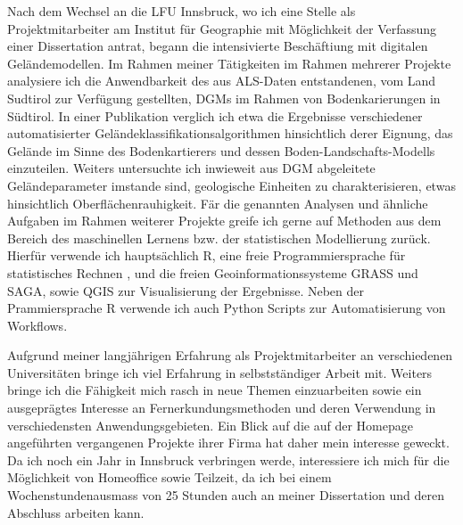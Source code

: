 \documentclass[11pt,a4paper,sans]{moderncv}        %
\begin{document}
Nach dem Wechsel an die LFU Innsbruck, wo ich eine Stelle als Projektmitarbeiter am Institut f\"{u}r Geographie mit M\"{o}glichkeit der Verfassung einer Dissertation antrat, begann die intensivierte Besch\"{a}ftiung mit digitalen Gel\"andemodellen. Im Rahmen meiner T\"{a}tigkeiten im Rahmen mehrerer Projekte analysiere ich die Anwendbarkeit des aus ALS-Daten entstandenen, vom Land Sudtirol zur Verf\"{u}gung gestellten, DGMs im Rahmen von Bodenkarierungen in S\"{u}dtirol. In einer Publikation verglich ich etwa die Ergebnisse verschiedener automatisierter Gel\"{a}ndeklassifikationsalgorithmen hinsichtlich derer Eignung, das Gel\"{a}nde im Sinne des Bodenkartierers und dessen Boden-Landschafts-Modells einzuteilen. Weiters untersuchte ich inwieweit aus DGM abgeleitete Gel\"{a}ndeparameter imstande sind, geologische Einheiten zu charakterisieren, etwas hinsichtlich Oberfl\"{a}chenrauhigkeit. F\"{a}r die genannten Analysen und \"{a}hnliche Aufgaben im Rahmen weiterer Projekte greife ich gerne auf Methoden aus dem Bereich des maschinellen Lernens bzw. der statistischen Modellierung zur\"{u}ck. Hierf\"{u}r verwende ich haupts\"achlich R, eine freie Programmiersprache f\"{u}r statistisches Rechnen , und die freien Geoinformationssysteme  GRASS und SAGA, sowie QGIS zur Visualisierung der Ergebnisse. Neben der Prammiersprache R  verwende ich auch Python Scripts zur Automatisierung von Workflows.

Aufgrund meiner langj\"{a}hrigen Erfahrung als Projektmitarbeiter an verschiedenen Universit\"{a}ten bringe ich viel Erfahrung in selbstst\"{a}ndiger Arbeit mit. Weiters bringe ich die F\"{a}higkeit mich rasch in neue Themen einzuarbeiten sowie ein ausgepr\"{a}gtes Interesse an Fernerkundungsmethoden und deren Verwendung in verschiedensten Anwendungsgebieten. Ein Blick auf die auf der Homepage angef\"{u}hrten vergangenen Projekte ihrer Firma hat daher mein interesse geweckt. Da ich noch ein Jahr in Innsbruck verbringen werde, interessiere ich mich f\"{u}r die M\"{o}glichkeit von Homeoffice sowie Teilzeit, da ich bei einem Wochenstundenausma{ss} von 25 Stunden auch an meiner Dissertation und deren Abschluss arbeiten kann. 


\makeletterclosing
\clearpage
\makecvtitle
\end{document}
